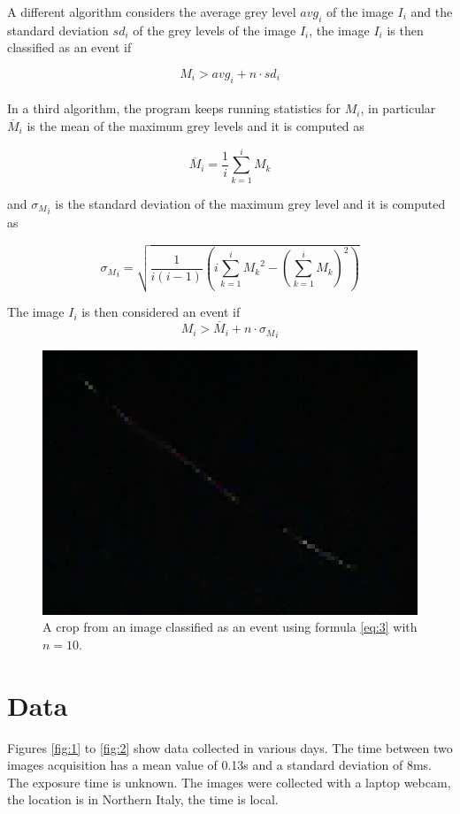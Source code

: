 \documentclass[a4paper,12pt]{article}
\begin{document}
A different algorithm considers the average grey level $avg_i$ of the image 
$I_i$ and the standard deviation $sd_i$ of the grey levels of the image $I_i$, 
the image $I_i$ is then classified as an event if 

\begin{equation}
M_i>avg_i+n\cdot sd_i
\end{equation}\\

In a third algorithm, the program keeps running statistics for $M_i$, in 
particular $\overline{M}_i$ is the mean of the maximum grey levels and it is 
computed as

$$\overline{M}_i=\frac{1}{i}\sum_{k=1}^i M_k$$

and ${\sigma_{M}}_{i}$ is the standard deviation of the maximum grey level and 
it is computed as

$${\sigma_{M}}_{i}=\sqrt{\frac{1}{i(i-1)}\left(i\sum_{k=1}^i {M_k}^2-\left(\sum_{k=1}^i M_k\right)^2\right)}$$


The image $I_i$ is then considered an event if 
\begin{equation}
M_i>\overline{M}_i+n\cdot{\sigma_{M}}_{i}\label{eq:3}
\end{equation}

\begin{figure}[h!]
  \centering
  \includegraphics[scale=0.5]{bella.png}
  \caption{A crop from an image classified as an event using formula \ref{eq:3} 
  with $n=10$.}
\end{figure}

\section{Data}
Figures \ref{fig:1} to \ref{fig:2} show data collected in various days.
The time between two images acquisition has a mean value of 0.13s and a standard 
deviation of 8ms.
The exposure time is unknown.
The images were collected with a laptop webcam, the location is in Northern 
Italy, the time is local.
\end{document}
